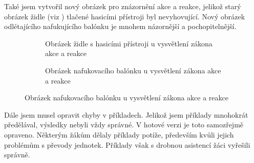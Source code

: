 {Také jsem vytvořil nový obrázek pro znázornění akce a reakce, jelikož starý obrázek židle (viz ) tlačené hasicími přístroji byl nevyhovující. Nový obrázek  odlétajícího nafukujícího balónku je mnohem názornější a pochopitelnější.}
\begin{figure}[H]
    \begingroup
    \makeatletter
    \renewcommand\thesubfigure{\thefigure~--~\@nameuse{subfiglabel@\alph{subfigure}}}
    \newcommand{\subfiglabel@a}{vlevo}
    \newcommand{\subfiglabel@b}{vpravo}
    \captionsetup[subfigure]{labelformat=simple, labelsep=colon}
    \renewcommand\p@subfigure{}
    \makeatother
    \begin{subfigure}{0.47\textwidth}
        \centering
        \setlength{\fboxsep}{0pt}
        \caption{Obrázek židle s hasicími přístroji u vysvětlení zákona akce a reakce \jaObr}
        \label{obr:zidlePrezentace}
    \end{subfigure}\hfill
    \begin{subfigure}{0.47\textwidth}
        \centering
        \setlength{\fboxsep}{0pt}
        \caption{Obrázek nafukovacího balónku u vysvětlení zákona akce a reakce \jaObr}
        \label{obr:balonekPrezentace}
    \end{subfigure}
    \endgroup
\end{figure}
{Dále jsem musel opravit chyby v příkladech. Jelikož jsem příklady mnohokrát předělával, výsledky nebyli vždy správné. V hotové verzi je toto samozřejmě opraveno. Některým žákům dělaly příklady potíže, především kvůli jejich problémům s převody jednotek. Příklady však s drobnou asistencí žáci vyřešili správně.}
\newpage
